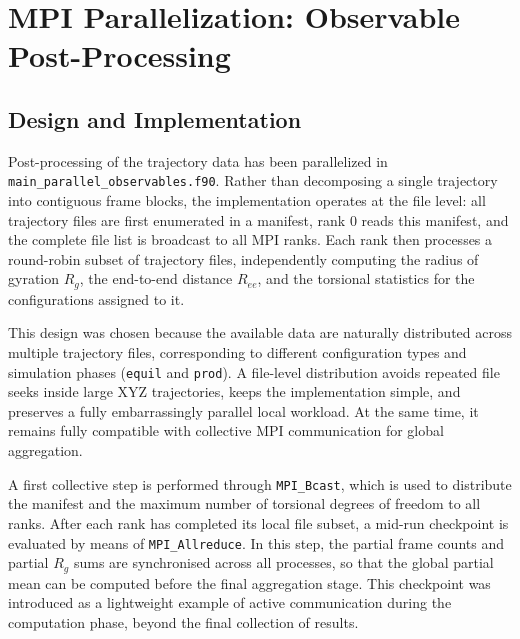 
\section{MPI Parallelization: Observable Post-Processing}
\label{sec:parallel_observables}

\subsection{Design and Implementation}

Post-processing of the trajectory data has been parallelized in
\texttt{main\_parallel\_observables.f90}. Rather than decomposing a single
trajectory into contiguous frame blocks, the implementation operates at the
file level: all trajectory files are first enumerated in a manifest, rank 0
reads this manifest, and the complete file list is broadcast to all MPI ranks.
Each rank then processes a round-robin subset of trajectory files,
independently computing the radius of gyration \(R_g\), the end-to-end
distance \(R_{ee}\), and the torsional statistics for the configurations
assigned to it.

This design was chosen because the available data are naturally distributed
across multiple trajectory files, corresponding to different configuration
types and simulation phases (\texttt{equil} and \texttt{prod}). A file-level
distribution avoids repeated file seeks inside large XYZ trajectories, keeps
the implementation simple, and preserves a fully embarrassingly parallel local
workload. At the same time, it remains fully compatible with collective MPI
communication for global aggregation.

A first collective step is performed through \texttt{MPI\_Bcast}, which is used
to distribute the manifest and the maximum number of torsional degrees of
freedom to all ranks. After each rank has completed its local file subset, a
mid-run checkpoint is evaluated by means of \texttt{MPI\_Allreduce}. In this
step, the partial frame counts and partial \(R_g\) sums are synchronised across
all processes, so that the global partial mean can be computed before the final
aggregation stage. This checkpoint was introduced as a lightweight example of
active communication during the computation phase, beyond the final collection
of results.

